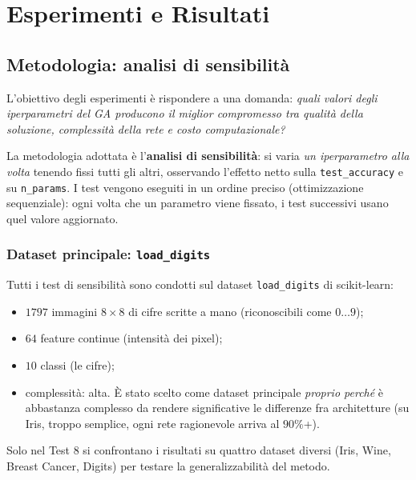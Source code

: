 \documentclass[11pt,a4paper]{article}
\newcommand{\fnt}{\texttt}     %
\begin{document}
\newpage

\section{Esperimenti e Risultati}

\subsection{Metodologia: analisi di sensibilità}

L'obiettivo degli esperimenti è rispondere a una domanda: \emph{quali
valori degli iperparametri del GA producono il miglior compromesso tra
qualità della soluzione, complessità della rete e costo computazionale?}

La metodologia adottata è l'\textbf{analisi di sensibilità}: si varia
\emph{un iperparametro alla volta} tenendo fissi tutti gli altri,
osservando l'effetto netto sulla \texttt{test\_accuracy} e su
\texttt{n\_params}. I test vengono eseguiti in un ordine preciso
(ottimizzazione sequenziale): ogni volta che un parametro viene fissato,
i test successivi usano quel valore aggiornato.

\subsubsection{Dataset principale: \fnt{load\_digits}}

Tutti i test di sensibilità sono condotti sul dataset \texttt{load\_digits}
di scikit-learn:
\begin{itemize}
    \item $1797$ immagini $8\times 8$ di cifre scritte a mano (riconoscibili
          come $0\dots 9$);
    \item $64$ feature continue (intensità dei pixel);
    \item $10$ classi (le cifre);
    \item complessità: alta. È stato scelto come dataset principale
          \emph{proprio perché} è abbastanza complesso da rendere
          significative le differenze fra architetture (su Iris, troppo
          semplice, ogni rete ragionevole arriva al $90\%$+).
\end{itemize}

Solo nel Test 8 si confrontano i risultati su quattro dataset diversi
(Iris, Wine, Breast Cancer, Digits) per testare la generalizzabilità del
metodo.
\end{document}
